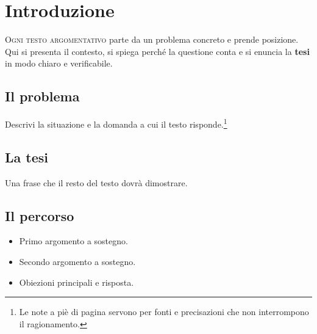 \chapter{Introduzione}


\lettrine{O}{gni testo argomentativo} parte da un problema concreto e prende
posizione. Qui si presenta il contesto, si spiega perché la questione conta e
si enuncia la \textbf{tesi} in modo chiaro e verificabile.

\section{Il problema}
Descrivi la situazione e la domanda a cui il testo risponde.\footnote{Le note
a piè di pagina servono per fonti e precisazioni che non interrompono il
ragionamento.}

\section{La tesi}
\begin{concetto}[Tesi]
Una frase che il resto del testo dovrà dimostrare.
\end{concetto}

\section{Il percorso}
\begin{itemize}
	\item Primo argomento a sostegno.
	\item Secondo argomento a sostegno.
	\item Obiezioni principali e risposta.
\end{itemize}
